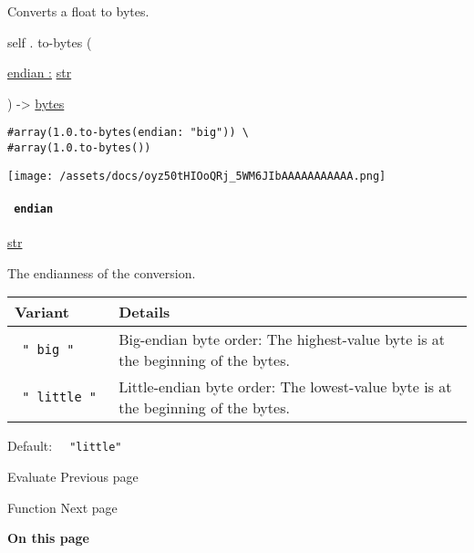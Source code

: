 Converts a float to bytes.

self { . } { to-bytes } (

{ \hyperref[definitions-to-bytes-parameters-endian]{endian :}
\href{/docs/reference/foundations/str/}{str} }

) -\textgreater{} \href{/docs/reference/foundations/bytes/}{bytes}

\begin{verbatim}
#array(1.0.to-bytes(endian: "big")) \
#array(1.0.to-bytes())
\end{verbatim}

\texttt{[image: /assets/docs/oyz50tHIOoQRj\_5WM6JIbAAAAAAAAAAA.png]}

\paragraph{\texorpdfstring{\texttt{\ endian\ }}{ endian }}\label{definitions-to-bytes-endian}

\href{/docs/reference/foundations/str/}{str}

The endianness of the conversion.

\begin{longtable}[]{@{}ll@{}}
\toprule\noalign{}
Variant & Details \\
\midrule\noalign{}
\endhead
\bottomrule\noalign{}
\endlastfoot
\texttt{\ "\ big\ "\ } & Big-endian byte order: The highest-value byte
is at the beginning of the bytes. \\
\texttt{\ "\ little\ "\ } & Little-endian byte order: The lowest-value
byte is at the beginning of the bytes. \\
\end{longtable}

Default: \texttt{\ }{\texttt{\ "little"\ }}\texttt{\ }

\href{/docs/reference/foundations/eval/}{\pandocbounded{}}

{ Evaluate } { Previous page }

\href{/docs/reference/foundations/function/}{\pandocbounded{}}

{ Function } { Next page }

\textbf{On this page}


